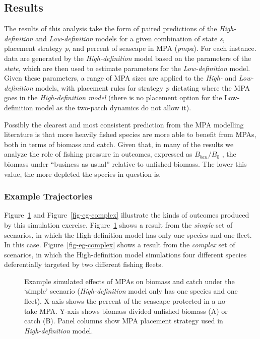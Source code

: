 \documentclass[
  default,
  lineno,
  referee]{sn-jnl}
\begin{document}
\subsection{Results}\label{results}

The results of this analysis take the form of paired predictions of the
\emph{High-definition} and \emph{Low-definition} models for a given
combination of state \emph{s}, placement strategy \emph{p}, and percent
of seascape in MPA (\emph{pmpa}). For each instance. data are generated
by the \emph{High-definition} model based on the parameters of the
\emph{state}, which are then used to estimate parameters for the
\emph{Low-definition} model. Given these parameters, a range of MPA
sizes are applied to the \emph{High-} and \emph{Low-definition} models,
with placement rules for strategy \emph{p} dictating where the MPA goes
in the \emph{High-definition model} (there is no placement option for
the Low-definition model as the two-patch dynamics do not allow it).

Possibly the clearest and most consistent prediction from the MPA
modelling literature is that more heavily fished species are more able
to benefit from MPAs, both in terms of biomass and catch. Given that, in
many of the results we analyze the role of fishing pressure in outcomes,
expressed as \(B_{bau}/B_0\) , the biomass under ``business as usual''
relative to unfished biomass. The lower this value, the more depleted
the species in question is.

\subsubsection{Example Trajectories}\label{sec-eg}

Figure~\ref{fig-eg-simple} and Figure~\ref{fig-eg-complex} illustrate
the kinds of outcomes produced by this simulation exercise.
Figure~\ref{fig-eg-simple} shows a result from the \emph{simple} set of
scenarios, in which the High-definition model has only one species and
one fleet. In this case. Figure~\ref{fig-eg-complex} shows a result from
the \emph{complex} set of scenarios, in which the High-definition model
simulations four different species deferentially targeted by two
different fishing fleets.

\begin{figure}


\caption{\label{fig-eg-simple}Example simulated effects of MPAs on
biomass and catch under the `simple' scenario (\emph{High-definition}
model only has one species and one fleet). X-axis shows the percent of
the seascape protected in a no-take MPA. Y-axis shows biomass divided
unfished biomass (A) or catch (B). Panel columns show MPA placement
strategy used in \emph{High-definition} model.}

\end{figure}%
\end{document}
